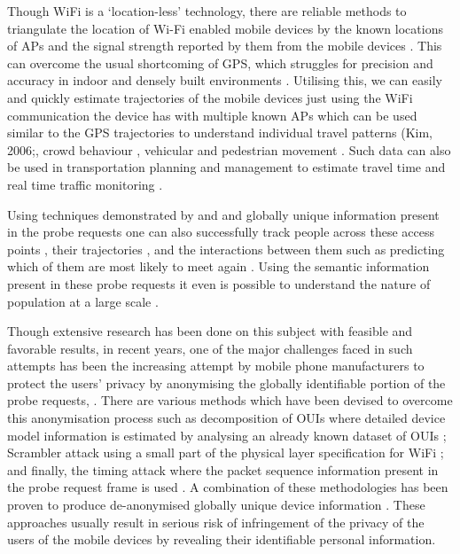 Though WiFi is a `location-less' technology, there are reliable methods to triangulate the location of Wi-Fi enabled mobile devices by the known locations of APs and the signal strength reported by them from the mobile devices \citep{he2003range, moore2004robust, lamarca2005place}.
This can overcome the usual shortcoming of GPS, which struggles for precision and accuracy in indoor and densely built environments \citep{zarim2006,kawaguchi2009wifi, xi2010locating}. 
Utilising this, we can easily and quickly estimate trajectories of the mobile devices just using the WiFi communication the device has with multiple known APs \citep{Sorensenlocation} which can be used similar to the GPS trajectories to understand individual travel patterns (Kim, 2006;\citep{reki2007,Sap2015}, crowd behaviour \citep{abedi2013bluetooth,mowafi2013tracking}, vehicular \citep{lu2010vehicle} and pedestrian movement \citep{xu2013pedestrian,fukuzaki2014pedestrian,wang2016gait}.
Such data can also be used in transportation planning and management to estimate travel time \citep{musa2011wiflow} and real time traffic monitoring \citep{abbott2013empirical}.

Using techniques demonstrated by \cite{franklin2006passive} and \cite{pang2007802} and globally unique information present in the probe requests one can also successfully track people across these access points \citep{cunche2014linking}, their trajectories \citep{musa2012tracking}, and the interactions between them \citep{cheng2012inferring,barbera2013signals,cunche2014know} such as predicting which of them are most likely to meet again \citep{cunche2012know}.
Using the semantic information present in these probe requests it even is possible to understand the nature of population at a large scale \citep{di2016mind}. 

Though extensive research has been done on this subject with feasible and favorable results, in recent years, one of the major challenges faced in such attempts has been the increasing attempt by mobile phone manufacturers to protect the users’ privacy by anonymising the globally identifiable portion of the probe requests, \citep{green2008}.
There are various methods which have been devised to overcome this anonymisation process such as decomposition of OUIs where detailed device model information is estimated by analysing an already known dataset of OUIs \citep{martin2016decomposition}; Scrambler attack using a small part of the physical layer specification for WiFi \citep{vo2016,bloessl2015scrambler}; and finally, the timing attack where the packet sequence information present in the probe request frame is used \citep{matte2016,cheng2016can}.
A combination of these methodologies has been proven to produce de-anonymised globally unique device information \citep{vanhoef2016, martin2017}. These approaches usually result in serious risk of infringement of the privacy of the users of the mobile devices by revealing their identifiable personal information.


